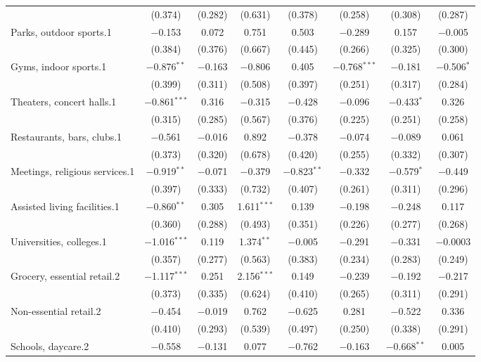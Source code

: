 \begin{table}[!htbp]
\begin{tabular}{@{\extracolsep{5pt}}lccccccc}
  & (0.374) & (0.282) & (0.631) & (0.378) & (0.258) & (0.308) & (0.287) \\ 
  Parks, outdoor sports.1 & $-$0.153 & 0.072 & 0.751 & 0.503 & $-$0.289 & 0.157 & $-$0.005 \\ 
  & (0.384) & (0.376) & (0.667) & (0.445) & (0.266) & (0.325) & (0.300) \\ 
  Gyms, indoor sports.1 & $-$0.876$^{**}$ & $-$0.163 & $-$0.806 & 0.405 & $-$0.768$^{***}$ & $-$0.181 & $-$0.506$^{*}$ \\ 
  & (0.399) & (0.311) & (0.508) & (0.397) & (0.251) & (0.317) & (0.284) \\ 
  Theaters, concert halls.1 & $-$0.861$^{***}$ & 0.316 & $-$0.315 & $-$0.428 & $-$0.096 & $-$0.433$^{*}$ & 0.326 \\ 
  & (0.315) & (0.285) & (0.567) & (0.376) & (0.225) & (0.251) & (0.258) \\ 
  Restaurants, bars, clubs.1 & $-$0.561 & $-$0.016 & 0.892 & $-$0.378 & $-$0.074 & $-$0.089 & 0.061 \\ 
  & (0.373) & (0.320) & (0.678) & (0.420) & (0.255) & (0.332) & (0.307) \\ 
  Meetings, religious services.1 & $-$0.919$^{**}$ & $-$0.071 & $-$0.379 & $-$0.823$^{**}$ & $-$0.332 & $-$0.579$^{*}$ & $-$0.449 \\ 
  & (0.397) & (0.333) & (0.732) & (0.407) & (0.261) & (0.311) & (0.296) \\ 
  Assisted living facilities.1 & $-$0.860$^{**}$ & 0.305 & 1.611$^{***}$ & 0.139 & $-$0.198 & $-$0.248 & 0.117 \\ 
  & (0.360) & (0.288) & (0.493) & (0.351) & (0.226) & (0.277) & (0.268) \\ 
  Universities, colleges.1 & $-$1.016$^{***}$ & 0.119 & 1.374$^{**}$ & $-$0.005 & $-$0.291 & $-$0.331 & $-$0.0003 \\ 
  & (0.357) & (0.277) & (0.563) & (0.383) & (0.234) & (0.283) & (0.249) \\ 
  Grocery, essential retail.2 & $-$1.117$^{***}$ & 0.251 & 2.156$^{***}$ & 0.149 & $-$0.239 & $-$0.192 & $-$0.217 \\ 
  & (0.373) & (0.335) & (0.624) & (0.410) & (0.265) & (0.311) & (0.291) \\ 
  Non-essential retail.2 & $-$0.454 & $-$0.019 & 0.762 & $-$0.625 & 0.281 & $-$0.522 & 0.336 \\ 
  & (0.410) & (0.293) & (0.539) & (0.497) & (0.250) & (0.338) & (0.291) \\ 
  Schools, daycare.2 & $-$0.558 & $-$0.131 & 0.077 & $-$0.762 & $-$0.163 & $-$0.668$^{**}$ & 0.005 \\ 

\end{tabular}
\end{table}
